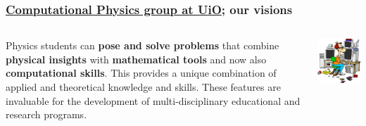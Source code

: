 \documentclass{beamer}
\begin{document}
\begin{frame}
\frametitle{\href{{http://www.mn.uio.no/fysikk/english/research/groups/computational/index.html}}{Computational Physics group at UiO}; our visions}

\begin{columns}
\begin{block}{}
Physics students can \textbf{pose and solve problems} that combine \textbf{physical insights} with \textbf{mathematical tools} and now also \textbf{computational skills}. This provides a unique combination of applied and theoretical knowledge and skills. These features are invaluable for the development of multi-disciplinary educational and research programs.
\end{block}

\centerline{\includegraphics[width=1.0\linewidth]{fig-future/computer_nerd2.jpg}}



\end{columns}
\end{frame}
\end{document}
